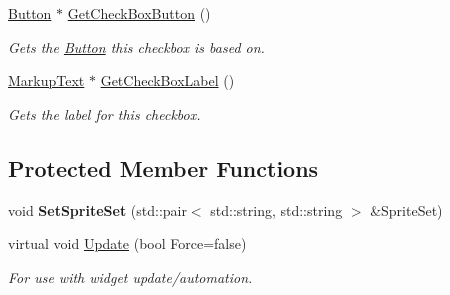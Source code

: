 \begin{DoxyCompactItemize}
\hyperlink{classphys_1_1UI_1_1Button}{Button} $\ast$ \hyperlink{classphys_1_1UI_1_1CheckBox_a728de15a5c8e512fd3fbb2b8a3f808ee}{GetCheckBoxButton} ()
\begin{DoxyCompactList}\small\item\em Gets the \hyperlink{classphys_1_1UI_1_1Button}{Button} this checkbox is based on. \item\end{DoxyCompactList}\item 
\hyperlink{classphys_1_1UI_1_1MarkupText}{MarkupText} $\ast$ \hyperlink{classphys_1_1UI_1_1CheckBox_a5f37379e69ef1259ab48c37a8dc200e9}{GetCheckBoxLabel} ()
\begin{DoxyCompactList}\small\item\em Gets the label for this checkbox. \item\end{DoxyCompactList}\end{DoxyCompactItemize}
\subsection*{Protected Member Functions}
\begin{DoxyCompactItemize}
\item 
\hypertarget{classphys_1_1UI_1_1CheckBox_ac20138946e42c608ac0808fc40fce4ce}{
void {\bfseries SetSpriteSet} (std::pair$<$ std::string, std::string $>$ \&SpriteSet)}
\label{dd/d10/classphys_1_1UI_1_1CheckBox_ac20138946e42c608ac0808fc40fce4ce}

\item 
\hypertarget{classphys_1_1UI_1_1CheckBox_ad988ce71809fd1dea6def42da50232eb}{
virtual void \hyperlink{classphys_1_1UI_1_1CheckBox_ad988ce71809fd1dea6def42da50232eb}{Update} (bool Force=false)}
\label{dd/d10/classphys_1_1UI_1_1CheckBox_ad988ce71809fd1dea6def42da50232eb}

\begin{DoxyCompactList}\small\item\em For use with widget update/automation. \item\end{DoxyCompactList}\end{DoxyCompactItemize}
